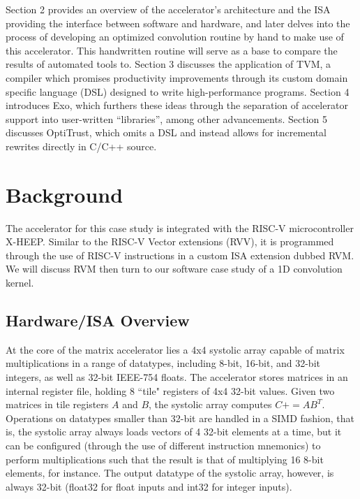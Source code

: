 \documentclass[acmsmall, nonacm=true]{acmart}
\newcommand{\pluseq}{\mathrel{{+}{=}}}
\begin{document}
Section 2 provides an overview of the accelerator's architecture and the ISA providing the interface between software and hardware, and later delves into the process of developing an optimized convolution routine by hand to make use of this accelerator. This handwritten routine will serve as a base to compare the results of automated tools to. Section 3 discusses the application of TVM, a compiler which promises productivity improvements through its custom domain specific language (DSL) designed to write high-performance programs. Section 4 introduces Exo, which furthers these ideas through the separation of accelerator support into user-written ``libraries'', among other advancements. Section 5 discusses OptiTrust, which omits a DSL and instead allows for incremental rewrites directly in C/C++ source.  

\section{Background}

The accelerator for this case study is integrated with the RISC-V microcontroller X-HEEP\cite{x_heep}. Similar to the RISC-V Vector extensions (RVV), it is programmed through the use of RISC-V instructions in a custom ISA extension dubbed RVM. We will discuss RVM then turn to our software case study of a 1D convolution kernel.

\subsection{Hardware/ISA Overview}

At the core of the matrix accelerator lies a 4x4 systolic array capable of matrix multiplications in a range of datatypes, including 8-bit, 16-bit, and 32-bit integers, as well as 32-bit IEEE-754 floats. The accelerator stores matrices in an internal register file, holding 8 ``tile" registers of 4x4 32-bit values. Given two matrices in tile registers $A$ and $B$, the systolic array computes $C \pluseq AB^T$. Operations on datatypes smaller than 32-bit are handled in a SIMD fashion, that is, the systolic array always loads vectors of 4 32-bit elements at a time, but it can be configured (through the use of different instruction mnemonics) to perform multiplications such that the result is that of multiplying 16 8-bit elements, for instance. The output datatype of the systolic array, however, is always 32-bit (float32 for float inputs and int32 for integer inputs).
\end{document}

